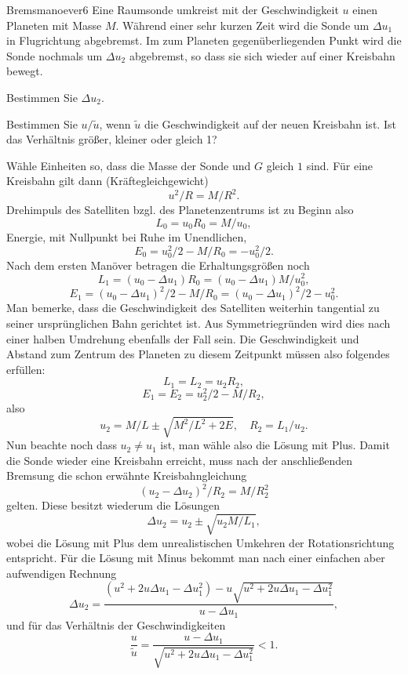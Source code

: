 \begin{problem}{Bremsmanoever}{6}
Eine Raumsonde umkreist mit der Geschwindigkeit $u$ einen Planeten mit Masse $M$.
Während einer sehr kurzen Zeit wird die Sonde um $\Delta u_1$ in Flugrichtung abgebremst.
Im zum Planeten gegenüberliegenden Punkt wird die Sonde nochmals um $\Delta u_2$ abgebremst,
so dass sie sich wieder auf einer Kreisbahn bewegt.
\begin{abcenum}
\item Bestimmen Sie $\Delta u_2$.
\item Bestimmen Sie $u/\tilde u$, wenn $\tilde u$ die Geschwindigkeit auf der neuen Kreisbahn ist. Ist das Verhältnis größer, kleiner oder gleich 1?
\end{abcenum}
\begin{solution}
Wähle Einheiten so, dass die Masse der Sonde und $G$ gleich $1$ sind.
Für eine Kreisbahn gilt dann (Kräftegleichgewicht)
\[
u^2 / R = M / R^2.
\]
Drehimpuls des Satelliten bzgl. des Planetenzentrums ist zu Beginn also
\[
L_0 = u_0 R_0 = M / u_0,
\]
Energie, mit Nullpunkt bei Ruhe im Unendlichen,
\[
E_0 = u_0^2 / 2 - M / R_0 = - u_0^2 / 2.
\]
Nach dem ersten Manöver betragen die Erhaltungsgrößen noch
\[
L_1 = (u_0 - \Delta u_1) R_0 = (u_0 - \Delta u_1) M / u_0^2,
\]
\[
E_1 = (u_0 - \Delta u_1)^2 / 2 - M / R_0 = (u_0 - \Delta u_1)^2 / 2 - u_0^2.
\]
Man bemerke, dass die Geschwindigkeit des Satelliten weiterhin tangential zu seiner ursprünglichen Bahn gerichtet ist. Aus Symmetriegründen wird dies nach einer halben Umdrehung ebenfalls der Fall sein. Die Geschwindigkeit und Abstand zum Zentrum des Planeten zu diesem Zeitpunkt müssen also folgendes erfüllen:
\[
L_1 = L_2 = u_2 R_2,
\]
\[
E_1 = E_2 = u_2^2 / 2 - M / R_2,
\]
also
\[
u_2 = M/L \pm \sqrt{M^2/L^2 + 2E}, \quad R_2 = L_1/u_2.
\]
Nun beachte noch dass $u_2 \neq u_1$ ist, man wähle also die Lösung mit Plus. Damit die Sonde wieder eine Kreisbahn erreicht, muss nach der anschließenden Bremsung die schon erwähnte Kreisbahngleichung
\[
(u_2 - \Delta u_2)^2 / R_2 = M / R_2^2
\]
gelten. Diese besitzt wiederum die Lösungen
\[
\Delta u_2 = u_2 \pm \sqrt{u_2 M / L_1},
\]
wobei die Lösung mit Plus dem unrealistischen Umkehren der Rotationsrichtung entspricht. Für die Lösung mit Minus bekommt man nach einer einfachen aber aufwendigen Rechnung
\[
\Delta u_2=\frac{(u^2+2u\Delta u_1-\Delta u_1^2)-u\sqrt{u^2+2u\Delta u_1-\Delta u_1^2}}{u-\Delta u_1},
\]
und für das Verhältnis der Geschwindigkeiten
\[
\frac{u}{\tilde{u}}=\frac{u-\Delta u_1}{\sqrt{u^2+2u\Delta u_1-\Delta u_1^2}} < 1.
\]
\end{solution}
\end{problem}


